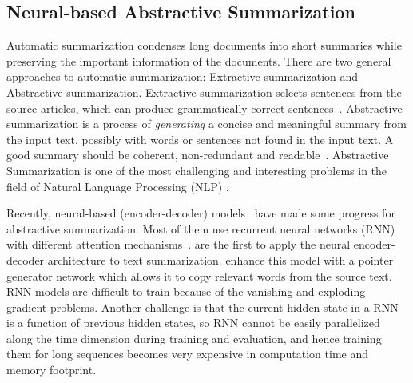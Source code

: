 \documentclass{nle}
\theoremstyle{definition}
\begin{document}
\subsection{Neural-based Abstractive Summarization}
Automatic summarization
condenses long documents into short summaries
while preserving the important information of the documents.
\citep{RadevHM02,AllahyariPASTGK17,Tian18}
There are two general approaches to automatic summarization: 
Extractive summarization and Abstractive summarization.
Extractive summarization selects sentences 
from the source articles, which can produce
grammatically correct sentences~\citep{BokaeiSL16,VermaL17,NaserasadiKS19,ZhongLWQH19}.
Abstractive summarization is a process of {\em generating} a concise and 
meaningful summary from the input text, possibly with words or sentences 
not found in the input text. 
A good summary should be coherent, 
non-redundant and readable~\citep{YaoWX17}.
Abstractive Summarization is one of the most challenging and 
interesting problems in the field of Natural Language Processing (NLP)
\citep{CareniniC08,PallottaDB09,SankarasubramaniamRG14,BingLLLGP15,RushCW15,LiHZ16,YaoWX17,MohamedO19,LierdeC19,NguyenCNN19}.

Recently, neural-based (encoder-decoder) models~\citep{RushCW15,ChopraAR16,NallapatiZSGX16,SeeLM17,PaulusXS17,LiuL19,ZhangWZ19,WangQW19}
have made some progress for abstractive summarization.
Most of them use recurrent neural networks (RNN) with different attention 
mechanisms~\citep{RushCW15,NallapatiZSGX16,SeeLM17,PaulusXS17,ZhangWZ19}. \citet{RushCW15} are the first to apply the 
neural encoder-decoder architecture to text summarization. 
\citet{SeeLM17} enhance this model with a pointer generator network 
which allows it to copy relevant words from the source text.
RNN models are difficult to train because of the 
vanishing and exploding gradient problems.
Another challenge is that the current hidden state in a RNN is 
a function of previous hidden states, so RNN cannot be easily
parallelized along the time dimension during training and evaluation, 
and hence training them for long sequences becomes very expensive in 
computation time and memory footprint.
\end{document}
